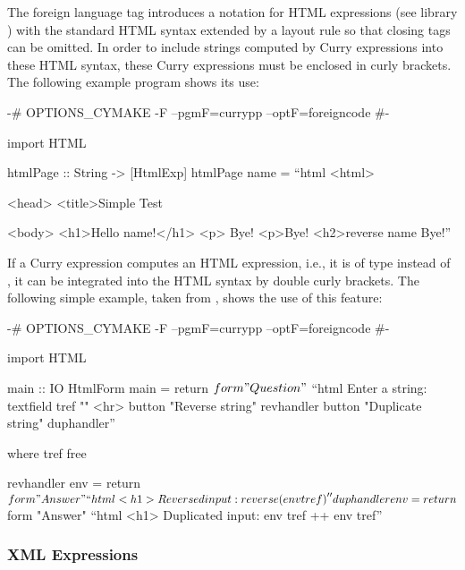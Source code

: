 The foreign language tag  introduces a notation
for HTML expressions (see \CYS library )
with the standard HTML syntax extended by a layout rule
so that closing tags can be omitted.
In order to include strings computed by Curry expressions
into these HTML syntax, these Curry expressions must be enclosed
in curly brackets.
The following example program shows its use:
\begin{curry}
{-# OPTIONS_CYMAKE -F --pgmF=currypp --optF=foreigncode #-}

import HTML

htmlPage :: String -> [HtmlExp]
htmlPage name = ``html
 <html>

  <head>
   <title>Simple Test

  <body>
   <h1>Hello {name}!</h1>
    <p>
     Bye!
    <p>Bye!
   <h2>{reverse name}
   Bye!''
\end{curry}
%
If a Curry expression computes an HTML expression,
i.e., it is of type  instead of ,
it can be integrated into the HTML syntax by double curly brackets.
The following simple example, taken from \cite{Hanus01PADL},
shows the use of this feature:

\begin{currynomath}
{-# OPTIONS_CYMAKE -F --pgmF=currypp --optF=foreigncode #-}

import HTML

main :: IO HtmlForm
main = return $ form "Question" $
         ``html
	     Enter a string: {{textfield tref ""}}
	     <hr>
             {{button "Reverse string"   revhandler}}
             {{button "Duplicate string" duphandler}}''

 where
  tref free

  revhandler env = return $ form "Answer"
    ``html <h1>Reversed input: {reverse (env tref)}''

  duphandler env = return $ form "Answer"
    ``html
       <h1>
         Duplicated input:
         {env tref ++ env tref}''
\end{currynomath}


\subsubsection{XML Expressions}

